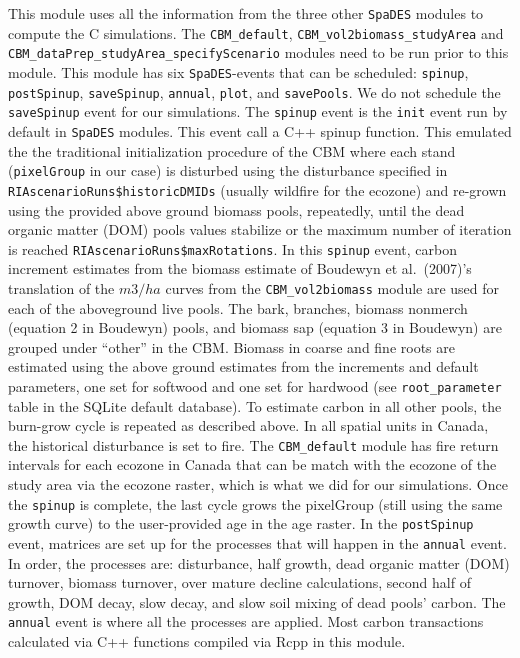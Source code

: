 \documentclass[
]{article}
\begin{document}
This module uses all the information from the three other
\texttt{SpaDES} modules to compute the C simulations. The
\texttt{CBM\_default}, \texttt{CBM\_vol2biomass\_studyArea} and
\texttt{CBM\_dataPrep\_studyArea\_specifyScenario} modules need to be
run prior to this module. This module has six \texttt{SpaDES}-events
that can be scheduled: \texttt{spinup}, \texttt{postSpinup},
\texttt{saveSpinup}, \texttt{annual}, \texttt{plot}, and
\texttt{savePools}. We do not schedule the \texttt{saveSpinup} event for
our simulations. The \texttt{spinup} event is the \texttt{init} event
run by default in \texttt{SpaDES} modules. This event call a C++ spinup
function. This emulated the the traditional initialization procedure of
the CBM where each stand (\texttt{pixelGroup} in our case) is disturbed
using the disturbance specified in
\texttt{RIAscenarioRuns\$historicDMIDs} (usually wildfire for the
ecozone) and re-grown using the provided above ground biomass pools,
repeatedly, until the dead organic matter (DOM) pools values stabilize
or the maximum number of iteration is reached
\texttt{RIAscenarioRuns\$maxRotations}. In this \texttt{spinup} event,
carbon increment estimates from the biomass estimate of Boudewyn et
al.~(2007)'s translation of the \(m3/ha\) curves from the
\texttt{CBM\_vol2biomass} module are used for each of the aboveground
live pools. The bark, branches, biomass nonmerch (equation 2 in
Boudewyn) pools, and biomass sap (equation 3 in Boudewyn) are grouped
under ``other'' in the CBM. Biomass in coarse and fine roots are
estimated using the above ground estimates from the increments and
default parameters, one set for softwood and one set for hardwood (see
\texttt{root\_parameter} table in the SQLite default database). To
estimate carbon in all other pools, the burn-grow cycle is repeated as
described above. In all spatial units in Canada, the historical
disturbance is set to fire. The \texttt{CBM\_default} module has fire
return intervals for each ecozone in Canada that can be match with the
ecozone of the study area via the ecozone raster, which is what we did
for our simulations. Once the \texttt{spinup} is complete, the last
cycle grows the pixelGroup (still using the same growth curve) to the
user-provided age in the age raster. In the \texttt{postSpinup} event,
matrices are set up for the processes that will happen in the
\texttt{annual} event. In order, the processes are: disturbance, half
growth, dead organic matter (DOM) turnover, biomass turnover, over
mature decline calculations, second half of growth, DOM decay, slow
decay, and slow soil mixing of dead pools' carbon. The \texttt{annual}
event is where all the processes are applied. Most carbon transactions
calculated via C++ functions compiled via Rcpp in this module.
\end{document}

